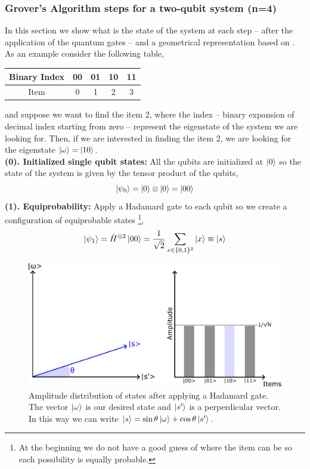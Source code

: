 \subsubsection{Grover's Algorithm steps for a two-qubit system (n=4)}
In this section we show what is the state of the system at each step -- after the application of the quantum gates -- and a geometrical representation based on \cite{Lavor2008Search}.\\
As  an example consider the following table,
\begin{center}
\begin{tabular}{ c | c | c | c | c }
  \hline			
  Binary Index & 00 & 01 & 10 & 11 \\
    \hline		
  Item & 0 & 1 & 2 & 3 \\
  \hline  
\end{tabular}
\end{center}
and suppose we want to find the item 2, where the index -- binary expansion of decimal index starting from zero -- represent the eigenstate of the system we are looking for. Then, if we are interested in finding the item 2, we are looking for the eigenstate $\ket{\omega} = \ket{10}$.\\
\textbf{(0). Initialized single qubit states:} All the qubits are initialized at $\ket{0}$ so the state of the system is given by the tensor product of the qubits,
\begin{equation}
    \ket{\psi_{0}} = \ket{0}\otimes \ket{0} = \ket{00}
\end{equation}
\textbf{(1). Equiprobability:} Apply a Hadamard gate to each qubit so we create a configuration of equiprobable states \footnote{At the beginning we do not have a good guess of where the item can be so each possibility is equally probable.},
\begin{equation}
    \ket{\psi_{1}} = \hat{H}^{\otimes 2}\ket{00} = \frac{1}{\sqrt{2}}\sum_{x \in \{0,1\}^{2}}\ket{x} \equiv \ket{s}
\end{equation}
\begin{figure}[h]
    \centering
    \includegraphics[scale=0.55]{Figures/Grover_Step1.pdf}
    \caption{Amplitude distribution of states after applying a Hadamard gate. The vector $\ket{\omega}$ is our desired state and $\ket{s'}$ is a perperdicular vector. In this way we can write $\ket{s} = \sin{\theta}\ket{\omega} + \cos{\theta}\ket{s'}$.}
    \label{fig:Grover_step1}
\end{figure}
